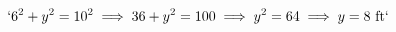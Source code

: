 \documentclass[preview]{standalone}
\begin{document}
\begin{align*}
`6^2 + y^2 = 10^2 \implies 36 + y^2 = 100 \implies y^2 = 64 \implies y = 8 \text{ ft}`
\end{align*}
\end{document}
